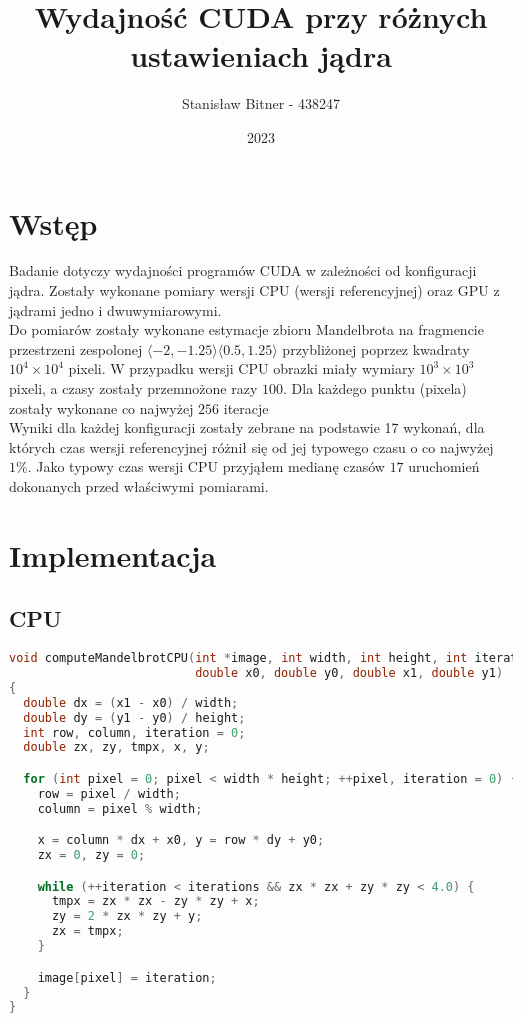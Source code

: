\documentclass[12pt, a4paper]{article}
\title{Wydajność CUDA przy różnych ustawieniach jądra}
\author{Stanisław Bitner - 438247}
\date{2023}
\begin{document}
\maketitle

\section*{Wstęp}
Badanie dotyczy wydajności programów CUDA w zależności od konfiguracji jądra.
Zostały wykonane pomiary wersji CPU (wersji referencyjnej) oraz GPU z jądrami
jedno i dwuwymiarowymi.\\
Do pomiarów zostały wykonane estymacje zbioru Mandelbrota na fragmencie
przestrzeni zespolonej $\langle -2, -1.25 \rangle \langle 0.5, 1.25 \rangle$
przybliżonej poprzez kwadraty $10^4 \times 10^4$ pixeli. W przypadku wersji CPU
obrazki miały wymiary $10^3 \times 10^3$ pixeli, a czasy zostały przemnożone
razy $100$. Dla każdego punktu (pixela) zostały wykonane co najwyżej $256$
iteracje\\
Wyniki dla każdej konfiguracji zostały zebrane na podstawie 17 wykonań, dla
których czas wersji referencyjnej różnił się od jej typowego czasu o co
najwyżej $1\%$. Jako typowy czas wersji CPU przyjąłem medianę czasów $17$
uruchomień dokonanych przed właściwymi pomiarami.

\section*{Implementacja}

\subsection*{CPU}
\begin{lstlisting}[language = C++]
void computeMandelbrotCPU(int *image, int width, int height, int iterations,
                          double x0, double y0, double x1, double y1)
{
  double dx = (x1 - x0) / width;
  double dy = (y1 - y0) / height;
  int row, column, iteration = 0;
  double zx, zy, tmpx, x, y;

  for (int pixel = 0; pixel < width * height; ++pixel, iteration = 0) {
    row = pixel / width;
    column = pixel % width;

    x = column * dx + x0, y = row * dy + y0;
    zx = 0, zy = 0;

    while (++iteration < iterations && zx * zx + zy * zy < 4.0) {
      tmpx = zx * zx - zy * zy + x;
      zy = 2 * zx * zy + y;
      zx = tmpx;
    }

    image[pixel] = iteration;
  }
}
\end{lstlisting}
\end{document}
